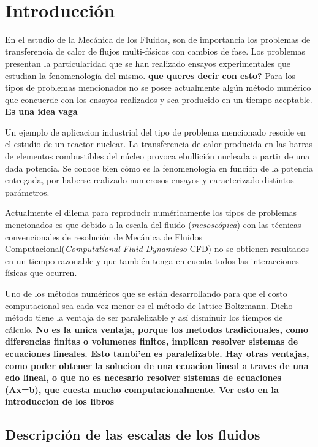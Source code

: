 ﻿﻿\chapter{Introducción}
\graphicspath{{figs/cap1/}}
\label{cap1}


En el estudio de la Mecánica de los Fluidos, son de importancia los problemas de transferencia de calor de flujos multi-fásicos con cambios de fase. 
Los problemas presentan la particularidad que se han realizado ensayos experimentales que estudian la fenomenología del mismo. \textbf{que queres decir con esto?}
Para los tipos de problemas mencionados no se posee actualmente algún método numérico que concuerde con los ensayos realizados y sea producido en un tiempo aceptable. \textbf{Es una idea vaga}

Un ejemplo de aplicacion industrial del tipo de problema mencionado rescide en el estudio de un reactor nuclear. La transferencia de calor producida en las barras de elementos combustibles del núcleo provoca ebullición nucleada a partir de una dada potencia. Se conoce bien cómo es la fenomenología en función de la potencia entregada, por haberse realizado numerosos ensayos y caracterizado distintos parámetros. 

Actualmente el dilema para reproducir numéricamente los tipos de problemas mencionados es que debido a la escala del fluido (\textit{mesoscópica}) con las técnicas convencionales de resolución de Mecánica de Fluidos Computacional(\textit{Computational Fluid Dynamicso} CFD) no se obtienen resultados en un tiempo razonable y que también tenga en cuenta todos las interacciones físicas que ocurren.

Uno de los métodos numéricos que se están desarrollando para que el costo computacional sea cada vez menor es el método de lattice-Boltzmann. Dicho método tiene la ventaja de ser paralelizable y así disminuir los tiempos de cálculo. \textbf{No es la unica ventaja, porque los metodos tradicionales, como diferencias finitas o volumenes finitos, implican resolver sistemas de ecuaciones lineales. Esto tambi’en es paralelizable. Hay otras ventajas, como poder obtener la solucion de una ecuacion lineal a traves de una edo lineal, o que no es necesario resolver sistemas de ecuaciones (Ax=b), que cuesta mucho computacionalmente. Ver esto en la introduccion de los libros}

\section{Descripción de las escalas de los fluidos}

